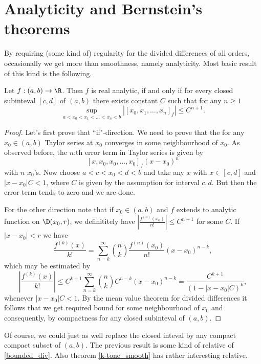 \section{Analyticity and Bernstein's theorems}

By requiring (some kind of) regularity for the divided differences of all orders, occasionally we get more than smoothness, namely analyticity. Most basic result of this kind is the following.

\begin{lause}\label{div_anal}
	Let $f : (a, b) \to \R$. Then $f$ is real analytic, if and only if for every closed subinteval $[c, d]$ of $(a, b)$ there exists constant $C$ such that for any $n \geq 1$
	\[
		\sup_{a < x_{0} < x_{1} < \ldots < x_{n}< b} |[x_{0}, x_{1}, \ldots, x_{n}]_{f}| \leq C^{n + 1}.
	\]
\end{lause}
\begin{proof}
	Let's first prove that ``if"-direction. We need to prove that the for any $x_{0} \in (a, b)$ Taylor series at $x_{0}$ converges in some neighbourhood of $x_{0}$. As observed before, the $n$:th error term in Taylor series is given by
	\[
		[x, x_{0}, x_{0}, \ldots, x_{0}]_{f} (x - x_{0})^{n}
	\]
	with $n$ $x_{0}$'s. Now choose $a < c < x_{0} < d < b$ and take any $x$ with $x \in [c, d]$ and $|x - x_{0}| C < 1$, where $C$ is given by the assumption for interval $c, d$. But then the error term tends to zero and we are done.

	For the other direction note that if $x_{0} \in (a, b)$ and $f$ extends to analytic function on $\D(x_{0}, r)$, we definititely have $\left|\frac{f^{(n)}(x_{0})}{n!}\right| \leq C^{n + 1}$ for some $C$. If $|x - x_{0}| < r$ we have
	\[
		\frac{f^{(k)}(x)}{k!} = \sum_{n = k}^{\infty} \binom{n}{k} \frac{f^{(n)}(x_{0})}{n!} (x - x_{0})^{n - k},
	\]
	which may be estimated by
	\[
	 \left|\frac{f^{(k)}(x)}{k!}\right| \leq C^{k + 1}\sum_{n = k}^{\infty} \binom{n}{k} C^{n - k} (x - x_{0})^{n - k} = \frac{C^{k + 1} }{(1 - |x - x_{0}| C)^{k}},
	\]
	whenever $|x - x_{0}| C < 1$. By the mean value theorem for divided differences it follows that we get required bound for some neighbourhood of $x_{0}$ and consequently, by compactness for any closed subinteval of $(a, b)$.
\end{proof}

Of course, we could just as well replace the closed inteval by any compact compact subset of $(a, b)$. The previous result is some kind of relative of \ref{bounded_div}. Also theorem \ref{k-tone_smooth} has rather interesting relative.

